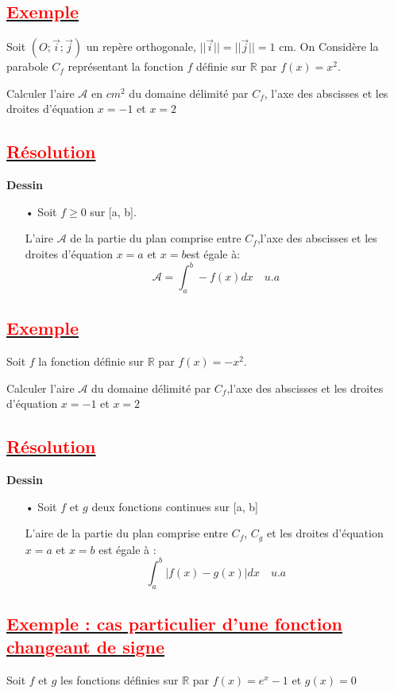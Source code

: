 \documentclass[12pt]{article}
\begin{document}
\subsection*{\underline{\textbf{\textcolor{red}{Exemple }}}}
Soit $(O ; \vec{i} ; \vec{j})$ un repère orthogonale, $||\vec{i}||=||\vec{j}||=1$ cm. On Considère la parabole $C_{f}$ représentant la fonction $f$ définie sur $\mathbb{R}$ par $f(x)=x^{2}$.

Calculer l'aire $\mathcal{A}$ en $cm^{2}$ du domaine délimité par $C_{f}$, l'axe des abscisses et les droites d'équation $x=-1$ et $x=2$
\subsection*{\underline{\textbf{\textcolor{red}{Résolution}}}}
\textbf{Dessin}

\begin{itemize}
\item[•] Soit $f\geq 0$ sur [a, b].

L'aire $\mathcal{A}$  de la partie du plan comprise entre $C_{f}$,l'axe des abscisses et les droites d'équation $x=a$ et $x=b$est égale à:
\[\mathcal{A}=\int_{a}^{b}-f(x)dx\quad u.a\]
\end{itemize}
\subsection*{\underline{\textbf{\textcolor{red}{Exemple}}}}
Soit $f$ la fonction définie sur $\mathbb{R}$ par $f(x)=-x^{2}$.

Calculer l'aire $\mathcal{A}$ du domaine délimité par $C_{f}$,l'axe des abscisses et les droites d'équation $x=-1$ et $x=2$
\subsection*{\underline{\textbf{\textcolor{red}{Résolution}}}}
\textbf{Dessin}
\begin{itemize}
\item[•] Soit $f$ et $g$ deux fonctions continues sur [a, b]

L'aire de la partie du plan comprise entre $C_{f}$, $C_{g}$ et les droites d'équation $x=a$ et $x=b$ est égale à :
\[\int_{a}^{b}|f(x)-g(x)|dx\quad u.a\]
\end{itemize}
\subsection*{\underline{\textbf{\textcolor{red}{Exemple : cas particulier d'une fonction changeant de signe}}}}
Soit $f$ et $g$ les fonctions définies sur $\mathbb{R}$ par $f(x)=e^{x}-1$ et $g(x)=0$
\end{document}
